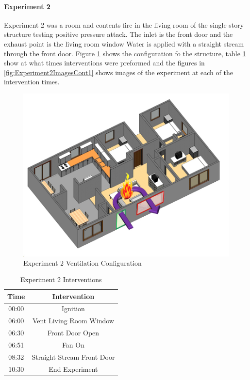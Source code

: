 \documentclass{article}
\begin{document}
\paragraph{Experiment 2}\mbox{}

Experiment 2 was a room and contents fire in the living room of the single story structure testing positive pressure attack. The inlet is the front door and the exhaust point is the living room window Water is applied with a straight stream through the front door. Figure \ref{fig:Exp2VentConfig} shows the configuration fo the structure, table \ref{Table:Exp2Interventions} show at what times interventions were preformed and the figures in \ref{fig:Experiment2ImagesCont1} shows images of the experiment at each of the intervention times.

 \begin{figure}[h!]
 	\centering
 	\includegraphics[width=5in]{0_Images/FireExperiments/Single_Story/Experiment_2.jpg}
 	\caption{Experiment 2 Ventilation Configuration}
 	\label{fig:Exp2VentConfig}
 \end{figure}

\begin{table}[H]
	\centering
	\caption{Experiment 2 Interventions}
	\begin{tabular}{|c|c|} 
		\hline
		Time & Intervention \\ \hline \hline
		00:00 & Ignition \\ \hline
		06:00 & Vent Living Room Window\\ \hline
		06:30 & Front Door Open \\ \hline
		06:51 & Fan On \\ \hline
		08:32 & Straight Stream Front Door \\ \hline
		10:30 & End Experiment \\ \hline
	\end{tabular}
	\label{Table:Exp2Interventions}
\end{table}
\end{document}
